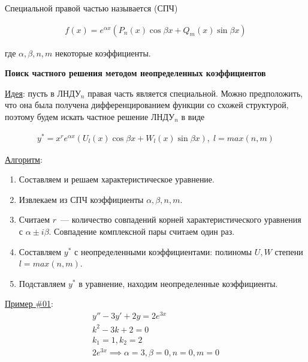 
\begin{definition}
  Специальной правой частью называется (СПЧ)

  \begin{align*}
    f(x) = e^{\alpha x} (P_{n}(x) \cos \beta x + Q_{m}(x) \sin \beta x)
  \end{align*}

  где \(\alpha, \beta, n, m\) некоторые коэффициенты.
\end{definition}

\textbf{Поиск частного решения методом неопределенных коэффициентов}

\underline{Идея}: пусть в ЛНДУ\(_n\) правая часть является специальной. Можно
предположить, что она была получена дифференцированием функции со схожей
структурой, поэтому будем искать частное решение ЛНДУ\(_n\) в виде

\begin{align*}
  y^{*} = x^{r} e^{\alpha x} (U_{l}(x) \cos \beta x + W_{l}(x) \sin \beta x),
  \; l = max(n, m)
\end{align*}

\underline{Алгоритм}:
\begin{enumerate}
  \item Составляем и решаем характеристическое уравнение.
  \item Извлекаем из СПЧ коэффициенты \(\alpha, \beta, n, m\).
  \item Считаем \(r\)~--- количество совпадений корней характеристического
  уравнения с \(\alpha \pm i \beta\). Совпадение комплексной пары считаем один
  раз.
  \item Составляем \(y^{*}\) с неопределенными коэффициентами: полиномы \(U, W\)
  степени \(l = max(n, m)\).
  \item Подставляем \(y^{*}\) в уравнение, находим неопределенные коэффициенты.
\end{enumerate}

\underline{Пример \#01}:
\begin{align*}
  y'' - 3 y' + 2y = 2 e^{3x} \\
  k^{2} - 3k + 2 = 0 \\
  k_{1} = 1, k_{2} = 2 \\
  2 e^{3x} \implies \alpha = 3, \beta = 0, n = 0, m = 0
\end{align*}

